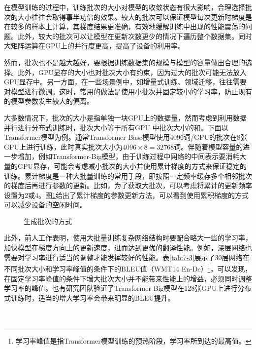 \parinterval 在模型训练的过程中，训练批次的大小对模型的收敛状态有很大影响，合理选择批次的大小往往会取得事半功倍的效果。较大的批次可以保证模型每次更新时梯度是在较多的样本上计算，其梯度结果更准确，有效地缓解训练中出现的性能震荡的问题。此外，较大的批次可以让模型在更新次数更少的情况下遍历整个数据集。同时大矩阵运算在GPU上的并行度更高，提高了设备的利用率。

\parinterval 然而，批次也不是越大越好，要根据训练数据集的规模与模型的容量做出合理的选择。此外，GPU显存的大小也对批次大小有约束，因为过大的批次可能无法放入GPU显存中。另一方面，在一些场景例中，如增量式训练、领域迁移，往往需要对模型进行微调。这时，常用的做法是使用小批次并固定较小的学习率，防止现有的模型参数发生较大的偏离。

\parinterval 大多数情况下，批次的大小是指单独一块GPU上的数据量，然而考虑到利用数据并行进行分布式训练时，批次大小等于所有GPU 中批次大小的和。下面以Transformer模型为例。通常Transformer-Base模型使用4096词/GPU的批次在8张GPU上进行训练，此时真实批次大小为$4096\times 8=32768$词。伴随着模型容量的进一步增加，例如Transformer-Big模型，由于训练过程中网络的中间表示要消耗大量的GPU显存，可能会考虑减小批次的大小并使用累计梯度的方式来保证稳定的训练。累计梯度是一种大批量训练的常用手段，即按照一定频率缓存多个相邻批次的梯度后再进行参数的更新。比如，为了获取大批次，可以考虑将累计的更新频率设置为2或4。图\ref{fig:7-17}给出了累计梯度的参数更新方法，可以看到使用累积梯度的方式可以减少设备的空闲时间。

\begin{figure}[htp]
\centering

\caption{生成批次的方式}
\label{fig:7-17}
\end{figure}

\parinterval 此外，前人工作表明，使用大批量训练复杂网络结构时要配合略大一些的学习率，加快模型在梯度方向上的更新速度，进而达到更优的翻译性能\cite{DBLP:conf/wmt/OttEGA18}。例如，深层网络也需要对学习率进行适当的调整才能发挥较好的性能。表\ref{tab:7-3}展示了30层网络在不同批次大小和学习率峰值的条件下的BLEU值（WMT14 En-De）\footnote{学习率峰值是指Transformer模型训练的预热阶段，学习率所到达的最高值。}。可以发现，在固定学习率峰值的条件下增大批次大小并不能带来性能上的增益，必须同时调整学习率的峰值。也有研究团队验证了Transformer-Big模型在128张GPU上进行分布式训练时，适当的增大学习率会带来明显的BLEU提升\cite{DBLP:conf/wmt/OttEGA18}。\\ \\ \\

